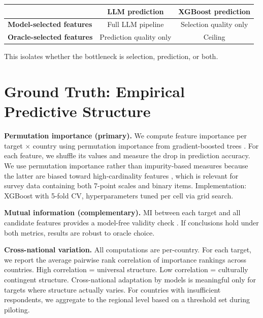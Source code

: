 \documentclass[11pt]{article}
\begin{document}
\begin{center}
\begin{tabular}{lcc}
\toprule
 & \textbf{LLM prediction} & \textbf{XGBoost prediction} \\
\midrule
\textbf{Model-selected features} & Full LLM pipeline & Selection quality only \\
\textbf{Oracle-selected features} & Prediction quality only & Ceiling \\
\bottomrule
\end{tabular}
\end{center}

This isolates whether the bottleneck is selection, prediction, or both.


\section{Ground Truth: Empirical Predictive Structure}
\label{sec:oracle}

\textbf{Permutation importance (primary).} We compute feature importance per target $\times$ country using permutation importance from gradient-boosted trees \citep{fisher2019permutation}. For each feature, we shuffle its values and measure the drop in prediction accuracy. We use permutation importance rather than impurity-based measures because the latter are biased toward high-cardinality features \citep{strobl2007bias}, which is relevant for survey data containing both 7-point scales and binary items. Implementation: XGBoost with 5-fold CV, hyperparameters tuned per cell via grid search.

\textbf{Mutual information (complementary).} MI between each target and all candidate features provides a model-free validity check \citep{kraskov2004estimating}. If conclusions hold under both metrics, results are robust to oracle choice.

\textbf{Cross-national variation.} All computations are per-country. For each target, we report the average pairwise rank correlation of importance rankings across countries. High correlation = universal structure. Low correlation = culturally contingent structure. Cross-national adaptation by models is meaningful only for targets where structure actually varies. For countries with insufficient respondents, we aggregate to the regional level based on a threshold set during piloting.


\end{document}
